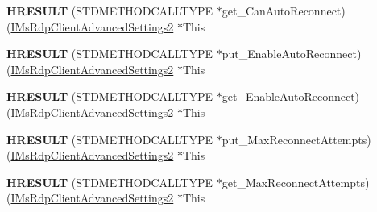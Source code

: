 \begin{DoxyCompactItemize}
{\bfseries H\+R\+E\+S\+U\+LT} (S\+T\+D\+M\+E\+T\+H\+O\+D\+C\+A\+L\+L\+T\+Y\+PE $\ast$get\+\_\+\+Can\+Auto\+Reconnect)(\hyperlink{interface_m_s_t_s_c_lib_1_1_i_ms_rdp_client_advanced_settings2}{I\+Ms\+Rdp\+Client\+Advanced\+Settings2} $\ast$This
\item 
\mbox{\label{struct_m_s_t_s_c_lib_1_1_i_ms_rdp_client_advanced_settings2_vtbl_a612c1c95ff86f316a9935be777a7cd78}} 
{\bfseries H\+R\+E\+S\+U\+LT} (S\+T\+D\+M\+E\+T\+H\+O\+D\+C\+A\+L\+L\+T\+Y\+PE $\ast$put\+\_\+\+Enable\+Auto\+Reconnect)(\hyperlink{interface_m_s_t_s_c_lib_1_1_i_ms_rdp_client_advanced_settings2}{I\+Ms\+Rdp\+Client\+Advanced\+Settings2} $\ast$This
\item 
\mbox{\label{struct_m_s_t_s_c_lib_1_1_i_ms_rdp_client_advanced_settings2_vtbl_a9ed5172988170f2d661c8cb9693504ae}} 
{\bfseries H\+R\+E\+S\+U\+LT} (S\+T\+D\+M\+E\+T\+H\+O\+D\+C\+A\+L\+L\+T\+Y\+PE $\ast$get\+\_\+\+Enable\+Auto\+Reconnect)(\hyperlink{interface_m_s_t_s_c_lib_1_1_i_ms_rdp_client_advanced_settings2}{I\+Ms\+Rdp\+Client\+Advanced\+Settings2} $\ast$This
\item 
\mbox{\label{struct_m_s_t_s_c_lib_1_1_i_ms_rdp_client_advanced_settings2_vtbl_a519ffe4baa8d66420855d7f146274ad6}} 
{\bfseries H\+R\+E\+S\+U\+LT} (S\+T\+D\+M\+E\+T\+H\+O\+D\+C\+A\+L\+L\+T\+Y\+PE $\ast$put\+\_\+\+Max\+Reconnect\+Attempts)(\hyperlink{interface_m_s_t_s_c_lib_1_1_i_ms_rdp_client_advanced_settings2}{I\+Ms\+Rdp\+Client\+Advanced\+Settings2} $\ast$This
\item 
\mbox{\label{struct_m_s_t_s_c_lib_1_1_i_ms_rdp_client_advanced_settings2_vtbl_abfc86de6a423f92bda97db0a9826bf48}} 
{\bfseries H\+R\+E\+S\+U\+LT} (S\+T\+D\+M\+E\+T\+H\+O\+D\+C\+A\+L\+L\+T\+Y\+PE $\ast$get\+\_\+\+Max\+Reconnect\+Attempts)(\hyperlink{interface_m_s_t_s_c_lib_1_1_i_ms_rdp_client_advanced_settings2}{I\+Ms\+Rdp\+Client\+Advanced\+Settings2} $\ast$This
\end{DoxyCompactItemize}
